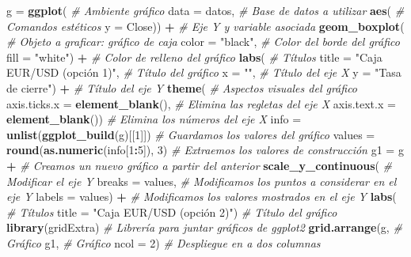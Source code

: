 \documentclass[
  11pt,
]{book}
\newenvironment{Shaded}{\begin{snugshade}}{\end{snugshade}}
\newcommand{\AttributeTok}[1]{\textcolor[rgb]{0.13,0.29,0.53}{#1}}
\newcommand{\CommentTok}[1]{\textcolor[rgb]{0.56,0.35,0.01}{\textit{#1}}}
\newcommand{\DecValTok}[1]{\textcolor[rgb]{0.00,0.00,0.81}{#1}}
\newcommand{\FunctionTok}[1]{\textcolor[rgb]{0.13,0.29,0.53}{\textbf{#1}}}
\newcommand{\NormalTok}[1]{#1}
\newcommand{\OtherTok}[1]{\textcolor[rgb]{0.56,0.35,0.01}{#1}}
\newcommand{\SpecialCharTok}[1]{\textcolor[rgb]{0.81,0.36,0.00}{\textbf{#1}}}
\newcommand{\StringTok}[1]{\textcolor[rgb]{0.31,0.60,0.02}{#1}}
\theoremstyle{definition}
\theoremstyle{definition}
\theoremstyle{definition}
\theoremstyle{definition}
\theoremstyle{remark}
\begin{document}
\begin{Shaded}
\begin{Highlighting}[]
\NormalTok{g }\OtherTok{=} \FunctionTok{ggplot}\NormalTok{( }\CommentTok{\# Ambiente gráfico}
  \AttributeTok{data =}\NormalTok{ datos, }\CommentTok{\# Base de datos a utilizar}
  \FunctionTok{aes}\NormalTok{( }\CommentTok{\# Comandos estéticos}
    \AttributeTok{y =}\NormalTok{ Close)) }\SpecialCharTok{+} \CommentTok{\# Eje Y y variable asociada}
  \FunctionTok{geom\_boxplot}\NormalTok{( }\CommentTok{\# Objeto a graficar: gráfico de caja}
    \AttributeTok{color =} \StringTok{"black"}\NormalTok{, }\CommentTok{\# Color del borde del gráfico}
    \AttributeTok{fill =} \StringTok{"white"}\NormalTok{) }\SpecialCharTok{+} \CommentTok{\# Color de relleno del gráfico}
  \FunctionTok{labs}\NormalTok{( }\CommentTok{\# Títulos }
    \AttributeTok{title =} \StringTok{"Caja EUR/USD (opción 1)"}\NormalTok{, }\CommentTok{\# Título del gráfico}
    \AttributeTok{x =} \StringTok{""}\NormalTok{, }\CommentTok{\# Título del eje X}
    \AttributeTok{y =} \StringTok{"Tasa de cierre"}\NormalTok{) }\SpecialCharTok{+} \CommentTok{\# Título del eje Y}
  \FunctionTok{theme}\NormalTok{( }\CommentTok{\# Aspectos visuales del gráfico}
    \AttributeTok{axis.ticks.x =} \FunctionTok{element\_blank}\NormalTok{(), }\CommentTok{\# Elimina las regletas del eje X}
    \AttributeTok{axis.text.x =} \FunctionTok{element\_blank}\NormalTok{()) }\CommentTok{\# Elimina los números del eje X}
\NormalTok{info }\OtherTok{=} \FunctionTok{unlist}\NormalTok{(}\FunctionTok{ggplot\_build}\NormalTok{(g)[[}\DecValTok{1}\NormalTok{]]) }\CommentTok{\# Guardamos los valores del gráfico}
\NormalTok{values }\OtherTok{=} \FunctionTok{round}\NormalTok{(}\FunctionTok{as.numeric}\NormalTok{(info[}\DecValTok{1}\SpecialCharTok{:}\DecValTok{5}\NormalTok{]), }\DecValTok{3}\NormalTok{) }\CommentTok{\# Extraemos los valores de construcción}
\NormalTok{g1 }\OtherTok{=}\NormalTok{ g }\SpecialCharTok{+} \CommentTok{\# Creamos un nuevo gráfico a partir del anterior}
  \FunctionTok{scale\_y\_continuous}\NormalTok{( }\CommentTok{\# Modificar el eje Y}
    \AttributeTok{breaks =}\NormalTok{ values, }\CommentTok{\# Modificamos los puntos a considerar en el eje Y}
    \AttributeTok{labels =}\NormalTok{ values) }\SpecialCharTok{+} \CommentTok{\# Modificamos los valores mostrados en el eje Y}
  \FunctionTok{labs}\NormalTok{( }\CommentTok{\# Títulos}
    \AttributeTok{title =} \StringTok{"Caja EUR/USD (opción 2)"}\NormalTok{) }\CommentTok{\# Título del gráfico}
\FunctionTok{library}\NormalTok{(gridExtra) }\CommentTok{\# Librería para juntar gráficos de ggplot2}
\FunctionTok{grid.arrange}\NormalTok{(g, }\CommentTok{\# Gráfico}
\NormalTok{             g1, }\CommentTok{\# Gráfico}
             \AttributeTok{ncol =} \DecValTok{2}\NormalTok{) }\CommentTok{\# Despliegue en a dos columnas }
\end{Highlighting}
\end{Shaded}
\end{document}
